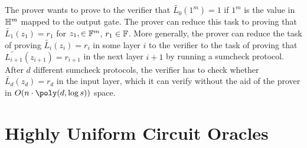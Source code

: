 The prover wants to prove to the verifier that $\tilde{L_0}(1^m) = 1$ if $1^m$
is the value in $\mathbb{H}^m$ mapped to the output gate. The prover can reduce this
task to proving that $\tilde{L_1}(z_1) = r_1$ for $z_1, \in \mathbb{F}^m$, $r_1 \in
\mathbb{F}$. More generally, the prover can reduce the task of proving
$\tilde{L_i}(z_i) = r_i$ in some layer $i$ to the verifier to the task of
proving that $\tilde{L_{i+1}}(z_{i+1}) = r_{i+1}$ in the next layer $i+1$ by
running a sumcheck protocol. After $d$ different sumcheck protocols, the
verifier has to check whether $\tilde{L_d}(z_d) = r_d$ in the input layer,
which it can verify without the aid of the prover in $O(n\cdot \poly(d, \log
s))$ space.

\section{Highly Uniform Circuit Oracles}